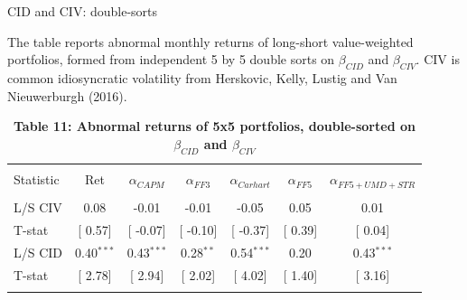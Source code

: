 \documentclass{beamer}
\begin{document}
\footnotesize
\begin{frame}{CID and CIV: double-sorts}
\begin{table}[!htbp] \centering 
  \caption*{\textbf{Table 11: Abnormal returns of 5x5 portfolios, double-sorted on $\beta_{CID}$ and $\beta_{CIV}$}}
  \label{} 
  \begin{flushleft}
    {\medskip \scriptsize
 The table reports abnormal monthly returns of long-short value-weighted portfolios, formed from independent 5 by 5 double sorts on $\beta_{CID}$ and $\beta_{CIV}$. CIV is common idiosyncratic volatility from Herskovic, Kelly, Lustig and Van Nieuwerburgh (2016). }
    \medskip
    \end{flushleft}
\begin{tabular}{@{\extracolsep{5pt}} lcccccc} 
\\[-1.8ex]\hline 
\hline \\[-1.8ex] 
Statistic & Ret & $\alpha_{CAPM}$ & $\alpha_{FF3}$ & $\alpha_{Carhart}$ & $\alpha_{FF5}$ & $\alpha_{FF5+UMD+STR}$ \\ 
\hline \\[-1.8ex] 
L/S CIV & 0.08 & -0.01 & -0.01 & -0.05 & 0.05 & 0.01 \\ 
T-stat & [ 0.57] & [ -0.07] & [ -0.10] & [ -0.37] & [ 0.39] & [ 0.04] \\
L/S CID & 0.40$^{***}$ & 0.43$^{***}$ & 0.28$^{**}$ & 0.54$^{***}$ & 0.20 & 0.43$^{***}$ \\ 
T-stat & [ 2.78] & [ 2.94] & [ 2.02] & [ 4.02] & [ 1.40] & [ 3.16] \\ 
\hline \\[-1.8ex] 
\end{tabular} 
\end{table}
\end{frame}
\end{document}
